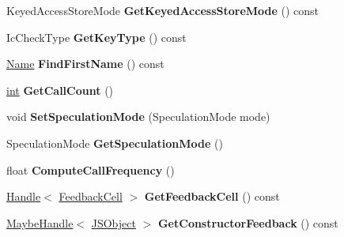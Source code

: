\begin{DoxyCompactItemize}
\item 
\mbox{\label{classv8_1_1internal_1_1FeedbackNexus_a396e49c2e3dfa573e148b526e95cae53}} 
Keyed\+Access\+Store\+Mode {\bfseries Get\+Keyed\+Access\+Store\+Mode} () const
\item 
\mbox{\label{classv8_1_1internal_1_1FeedbackNexus_a3c56d24ba0fb698aec4354ba83b0609b}} 
Ic\+Check\+Type {\bfseries Get\+Key\+Type} () const
\item 
\mbox{\label{classv8_1_1internal_1_1FeedbackNexus_a4cf67bba4f4958c7c7195ea3f76b0825}} 
\mbox{\hyperlink{classv8_1_1internal_1_1Name}{Name}} {\bfseries Find\+First\+Name} () const
\item 
\mbox{\label{classv8_1_1internal_1_1FeedbackNexus_a5828e49301808b3e1b8e937ed680c058}} 
\mbox{\hyperlink{classint}{int}} {\bfseries Get\+Call\+Count} ()
\item 
\mbox{\label{classv8_1_1internal_1_1FeedbackNexus_adda9d9e1d72ffb6a9653161c6ad384a7}} 
void {\bfseries Set\+Speculation\+Mode} (Speculation\+Mode mode)
\item 
\mbox{\label{classv8_1_1internal_1_1FeedbackNexus_af2907bd899f17bd775afad6d02fbe3fc}} 
Speculation\+Mode {\bfseries Get\+Speculation\+Mode} ()
\item 
\mbox{\label{classv8_1_1internal_1_1FeedbackNexus_a3c84f419de633fe653ba293f21952e69}} 
float {\bfseries Compute\+Call\+Frequency} ()
\item 
\mbox{\label{classv8_1_1internal_1_1FeedbackNexus_a0cb2201bfbe89ddeda0756602de7ea4e}} 
\mbox{\hyperlink{classv8_1_1internal_1_1Handle}{Handle}}$<$ \mbox{\hyperlink{classv8_1_1internal_1_1FeedbackCell}{Feedback\+Cell}} $>$ {\bfseries Get\+Feedback\+Cell} () const
\item 
\mbox{\label{classv8_1_1internal_1_1FeedbackNexus_a80b4d54c77a613be450b8d716eb6658c}} 
\mbox{\hyperlink{classv8_1_1internal_1_1MaybeHandle}{Maybe\+Handle}}$<$ \mbox{\hyperlink{classv8_1_1internal_1_1JSObject}{J\+S\+Object}} $>$ {\bfseries Get\+Constructor\+Feedback} () const

\end{DoxyCompactItemize}
